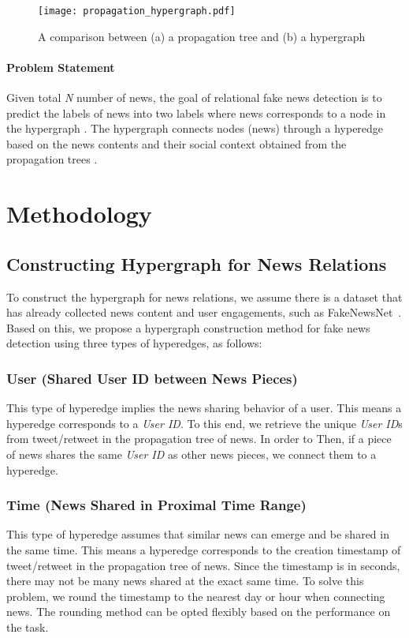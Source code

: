 \documentclass[conference]{IEEEtran}
\begin{document}
\begin{figure}
\centering
\texttt{[image: propagation\_hypergraph.pdf]}
\caption{A comparison between (a) a propagation tree and (b) a hypergraph} \label{ComparePropagationHypergraph}
\end{figure}
\hfill

\paragraph{\textbf{Problem Statement}} Given total \textit{N} number of news, the goal of relational fake news detection is to predict the labels of news into two labels  where news corresponds to a node in the hypergraph . The hypergraph connects nodes (news) through a hyperedge based on the news contents  and their social context obtained from the propagation trees .


\section{Methodology}
\subsection{Constructing Hypergraph for News Relations}
\label{Hypergraph_Construction}
To construct the hypergraph for news relations, we assume there is a dataset that has already collected news content and user engagements, such as FakeNewsNet~\cite{shu2020fakenewsnet}. Based on this, we propose a hypergraph construction method for fake news detection using three types of hyperedges, as follows:
\hfill\\

\subsubsection{\textbf{User} (Shared User ID between News Pieces)} This type of hyperedge implies the news sharing behavior of a user. This means a hyperedge corresponds to a \textit{User ID}. To this end, we retrieve the unique \textit{User ID}s from tweet/retweet in the propagation tree of news. In order to Then, if a piece of news shares the same \textit{User ID} as other news pieces, we connect them to a hyperedge.
\hfill\\


\subsubsection{\textbf{Time} (News Shared in Proximal Time Range)}
This type of hyperedge assumes that similar news can emerge and be shared in the same time. This means a hyperedge corresponds to the creation timestamp of tweet/retweet in the propagation tree of news. Since the timestamp is in seconds, there may not be many news shared at the exact same time. To solve this problem, we round the timestamp to the nearest day or hour when connecting news. The rounding method can be opted flexibly based on the performance on the task.
\hfill\\
\end{document}
